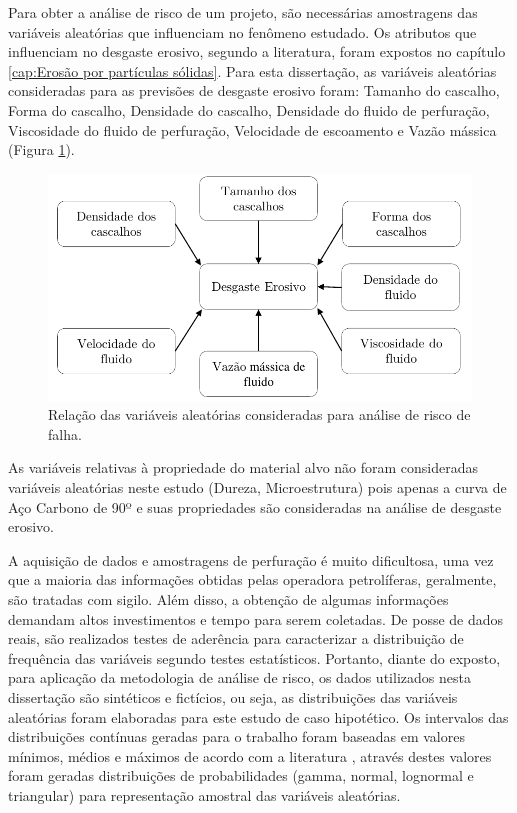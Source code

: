  Para obter a análise de risco de um projeto, são necessárias amostragens das variáveis aleatórias que influenciam no fenômeno estudado. Os atributos que influenciam no desgaste erosivo, segundo a literatura, foram expostos no capítulo \ref{cap:Erosão por partículas sólidas}. Para esta dissertação, as variáveis aleatórias consideradas para as previsões de desgaste erosivo foram: Tamanho do cascalho, Forma do cascalho, Densidade do cascalho, Densidade do fluido de perfuração, Viscosidade do fluido de perfuração, Velocidade de escoamento e Vazão mássica (Figura \ref{fig:erosaoatb2}). 

\begin{figure}[H] 
    \centering  
    \includegraphics{Figuras/erosaoatb2.pdf}  
    \caption{Relação das variáveis aleatórias consideradas para análise de risco de falha.}  
    \label{fig:erosaoatb2}  
\end{figure}

As variáveis relativas à propriedade do material alvo não foram consideradas variáveis aleatórias neste estudo (Dureza, Microestrutura) pois apenas a curva de Aço Carbono de 90º e suas propriedades são consideradas na análise de desgaste erosivo. 

A aquisição de dados e amostragens de perfuração é muito dificultosa, uma vez que a maioria das informações obtidas pelas operadora petrolíferas, geralmente, são tratadas com sigilo. Além disso, a obtenção de algumas informações demandam altos investimentos e tempo para serem coletadas. De posse de dados reais, são realizados testes de aderência para caracterizar a distribuição de frequência das variáveis segundo testes estatísticos. Portanto, diante do exposto, para aplicação da metodologia de análise de risco, os dados utilizados nesta dissertação são sintéticos e fictícios, ou seja, as distribuições das variáveis aleatórias foram elaboradas para este estudo de caso hipotético. Os intervalos das distribuições contínuas geradas para o trabalho foram baseadas em valores mínimos, médios e máximos de acordo com a literatura \cite{bortotti} \cite{santoss2} \cite{pereira}, através destes valores foram geradas distribuições de probabilidades (gamma, normal, lognormal e triangular) para representação amostral das variáveis aleatórias. 

